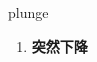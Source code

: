 
\begin{frame}
{\huge plunge}
\begin{center}
\begin{enumerate}\Large
  \item \textbf{突然下降}
\end{enumerate}
\end{center}
\end{frame}
